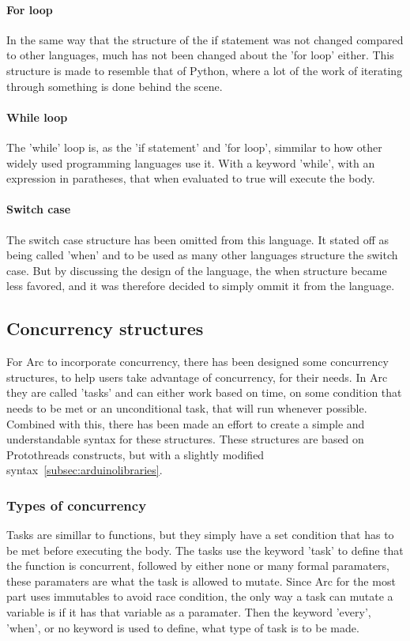 \paragraph{For loop} In the same way that the structure of the if statement was not changed compared to other languages, much has not been changed about the 'for loop' either. This structure is made to resemble that of Python, where a lot of the work of iterating through something is done behind the scene.

\paragraph{While loop} The 'while' loop is, as the 'if statement' and 'for loop', simmilar to how other widely used programming languages use it. With a keyword 'while', with an expression in paratheses, that when evaluated to true will execute the body.

\paragraph{Switch case} The switch case structure has been omitted from this language. It stated off as being called 'when' and to be used as many other languages structure the switch case. But by discussing the design of the language, the when structure became less favored, and it was therefore decided to simply ommit it from the language.


\subsection{Concurrency structures}\label{sec:concurrency structures}
For Arc to incorporate concurrency, there has been designed some concurrency structures, to help users take advantage of concurrency, for their needs. In Arc they are called 'tasks' and can either work based on time, on some condition that needs to be met or an unconditional task, that will run whenever possible. Combined with this, there has been made an effort to create a simple and understandable syntax for these structures. These structures are based on Protothreads constructs, but with a slightly modified syntax~\ref{subsec:arduinolibraries}.


\subsubsection{Types of concurrency}
Tasks are simillar to functions, but they simply have a set condition that has to be met before executing the body. The tasks use the keyword 'task' to define that the function is concurrent, followed by either none or many formal paramaters, these paramaters are what the task is allowed to mutate. Since Arc for the most part uses immutables to avoid race condition, the only way a task can mutate a variable is if it has that variable as a paramater. Then the keyword 'every', 'when', or no keyword is used to define, what type of task is to be made.

